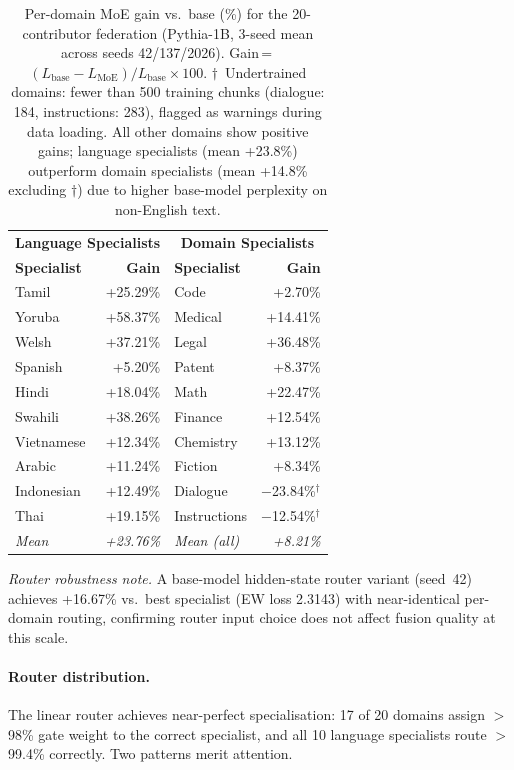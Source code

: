 \documentclass{article}
\begin{document}
\begin{table}[h]
\centering
\caption{Per-domain MoE gain vs.\ base (\%) for the 20-contributor federation (Pythia-1B, 3-seed mean across seeds 42/137/2026). Gain\,=\,$(L_\text{base}-L_\text{MoE})/L_\text{base}\times100$. $\dagger$~Undertrained domains: fewer than 500 training chunks (dialogue: 184, instructions: 283), flagged as warnings during data loading. All other domains show positive gains; language specialists (mean +23.8\%) outperform domain specialists (mean +14.8\% excluding $\dagger$) due to higher base-model perplexity on non-English text.}
\label{tab:exp3_perdomain}
\small
\begin{tabular}{lrlr}
\toprule
\multicolumn{2}{c}{\textbf{Language Specialists}} & \multicolumn{2}{c}{\textbf{Domain Specialists}} \\
\textbf{Specialist} & \textbf{Gain} & \textbf{Specialist} & \textbf{Gain} \\
\midrule
Tamil      & +25.29\% & Code         & +2.70\%  \\
Yoruba     & +58.37\% & Medical      & +14.41\% \\
Welsh      & +37.21\% & Legal        & +36.48\% \\
Spanish    & +5.20\%  & Patent       & +8.37\%  \\
Hindi      & +18.04\% & Math         & +22.47\% \\
Swahili    & +38.26\% & Finance      & +12.54\% \\
Vietnamese & +12.34\% & Chemistry    & +13.12\% \\
Arabic     & +11.24\% & Fiction      & +8.34\%  \\
Indonesian & +12.49\% & Dialogue     & $-$23.84\%$^\dagger$ \\
Thai       & +19.15\% & Instructions & $-$12.54\%$^\dagger$ \\
\midrule
\textit{Mean} & \textit{+23.76\%} & \textit{Mean (all)} & \textit{+8.21\%} \\
\bottomrule
\end{tabular}
\end{table}

\emph{Router robustness note.} A base-model hidden-state router variant (seed~42) achieves +16.67\% vs.\ best specialist (EW loss 2.3143) with near-identical per-domain routing, confirming router input choice does not affect fusion quality at this scale.

\paragraph{Router distribution.} The linear router achieves near-perfect specialisation: 17 of 20 domains assign ${>}$98\% gate weight to the correct specialist, and all 10 language specialists route ${>}$99.4\% correctly. Two patterns merit attention.
\end{document}
